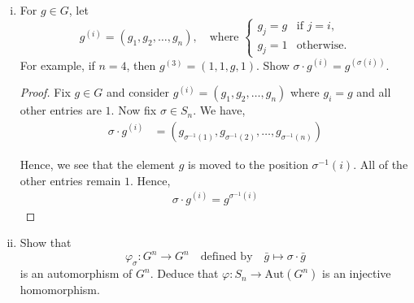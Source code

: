 \documentclass[11pt, reqno]{amsart}
\theoremstyle{plain}
\theoremstyle{definition}
\theoremstyle{example}
\def\Aut{\mathrm{Aut}}
\def\f{\varphi}
\begin{document}
\begin{enumerate}[1.]
\begin{enumerate}[(a)]
\begin{enumerate}[(i)]
\begin{proof}
Let $\sigma, \tau \in S_n$ and let $g = (g_1, g_2, \ldots, g_n) \in G^n$. We have,
\begin{align*}
\tau(\sigma(g)) &= \tau(g_{\sigma^{-1}(1)}, g_{\sigma^{-1}(2)}, \ldots, g_{\sigma^{-1}(n)})\\
&= (g_{\tau^{-1}(\sigma^{-1}(1))}, g_{\tau^{-1}(\sigma^{-1}(2))}, \ldots, g_{\tau^{-1}(\sigma^{-1}(n))})\\
&= (\sigma \tau) \circ g
\end{align*}

Now let $1 \in S_n$ be the identity element. Observe that $1^{-1} = 1$. Then,
\begin{align*}
1(g) &= (g_{1}, \ldots, g_{n})\\
&= g
\end{align*}

Hence, this defines a valid group action.
\end{proof}

\item For $g \in G$, let 
$$g^{(i)} = (g_1, g_2, \dots, g_n), \quad \text{where } \begin{cases}
	g_j = g & \text{if }j = i,\\
	g_j = 1 & \text{otherwise.}
	\end{cases}$$ 
For example, if $n=4$, then $g^{(3)} = (1, 1, g, 1)$. Show $\sigma \cdot g^{(i)} = g^{(\sigma(i))}$.

\begin{proof}
Fix $g \in G$ and consider $g^{(i)} = (g_1, g_2, \ldots, g_n)$ where $g_i = g$ and all other entries are $1$. Now fix $\sigma \in S_n$. We have,
\begin{align*}
\sigma \cdot g^{(i)} &= (g_{\sigma^{-1}(1)}, g_{\sigma^{-1}(2)}, \ldots, g_{\sigma^{-1}(n)})
\end{align*}

Hence, we see that the element $g$ is moved to the position $\sigma^{-1}(i)$. All of the other entries remain $1$. Hence,
\begin{align*}
\sigma \cdot g^{(i)} = g^{\sigma^{-1}(i)}
\end{align*}
\end{proof}
\item Show that 
$$\f_\sigma: G^n \to G^n \quad \text{defined by} \quad \bar{g} \mapsto \sigma \cdot \bar{g}$$
is an automorphism of $G^n$. Deduce that $\f: S_n \to \Aut(G^n)$ is an injective homomorphism.
\end{enumerate}



\end{enumerate}
\end{enumerate}
\end{document}
